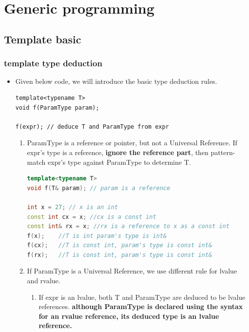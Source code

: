 \documentclass[a4paper,11pt,twoside]{book}
\begin{document}
     
\chapter{Generic programming}
     
\section{Template basic}


\subsection{template type deduction}
\begin{itemize}

	\item Given below code, we will introduce the basic type deduction rules.
\begin{lstlisting}[numbers=none]
template<typename T>
void f(ParamType param);

f(expr); // deduce T and ParamType from expr
\end{lstlisting}

\begin{enumerate}
	
	\item ParamType is a reference or pointer, but not a Universal Reference. If expr's type is a reference, \textbf{ignore the reference part}, then pattern-match expr's type against ParamType to determine T.
\begin{lstlisting}[frame=single, language=c++]
template<typename T>
void f(T& param); // param is a reference
	
int x = 27; // x is an int
const int cx = x; //cx is a const int
const int& rx = x; //rx is a reference to x as a const int
f(x);    //T is int param's type is int&
f(cx);   //T is const int, param's type is const int&
f(rx);   //T is const int, param's type is const int&
\end{lstlisting}
	
	\item If ParamType is a Universal Reference, we use different rule for lvalue and rvalue.
	
	\begin{enumerate}
		\item If expr is an lvalue, both T and ParamType are deduced to be lvalue references.
		\textbf{although ParamType is declared using the syntax for an rvalue reference, its deduced type is an lvalue reference.}
		

\end{enumerate}
\end{enumerate}
\end{itemize}
\end{document}
